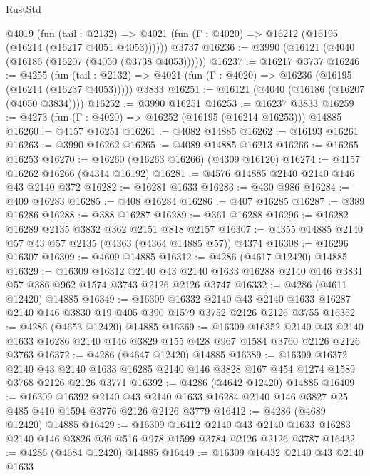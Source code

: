 \begin{lexlean}{RustStd}
\begin{coremodule}
    @4019
      (fun (tail : @2132) =>
      @4021 (fun (Γ : @4020) => @16212 (@16195 (@16214 (@16217 @4051 @4053))))))
    @3737
@16236 := @3990 (@16121 (@4040 (@16186 (@16207 (@4050 (@3738 @4053))))))
@16237 := @16217 @3737
@16246 := @4255
    (fun (tail : @2132) => @4021 (fun (Γ : @4020) => @16236 (@16195 (@16214 (@16237 @4053)))))
    @3833
@16251 := @16121 (@4040 (@16186 (@16207 (@4050 @3834))))
@16252 := @3990 @16251
@16253 := @16237 @3833
@16259 := @4273 (fun (Γ : @4020) => @16252 (@16195 (@16214 @16253))) @14885
@16260 := @4157 @16251
@16261 := @4082 @14885
@16262 := @16193 @16261
@16263 := @3990 @16262
@16265 := @4089 @14885 @16213
@16266 := @16265 @16253
@16270 := @16260 (@16263 @16266) (@4309 @16120)
@16274 := @4157 @16262 @16266 (@4314 @16192)
@16281 := @4576 @14885 @2140 @2140 @146 @43 @2140 @372
@16282 := @16281 @1633
@16283 := @430 @986
@16284 := @409 @16283
@16285 := @408 @16284
@16286 := @407 @16285
@16287 := @389 @16286
@16288 := @388 @16287
@16289 := @361 @16288
@16296 := @16282 @16289 @2135 @3832 @362 @2151 @818 @2157
@16307 := @4355 @14885 @2140 @57 @43 @57 @2135 (@4363 (@4364 @14885 @57)) @4374
@16308 := @16296 @16307
@16309 := @4609 @14885
@16312 := @4286 (@4617 @12420) @14885
@16329 := @16309
    @16312
    @2140
    @43
    @2140
    @1633
    @16288
    @2140
    @146
    @3831
    @57
    @386
    @962
    @1574
    @3743
    @2126
    @2126
    @3747
@16332 := @4286 (@4611 @12420) @14885
@16349 := @16309
    @16332
    @2140
    @43
    @2140
    @1633
    @16287
    @2140
    @146
    @3830
    @19
    @405
    @390
    @1579
    @3752
    @2126
    @2126
    @3755
@16352 := @4286 (@4653 @12420) @14885
@16369 := @16309
    @16352
    @2140
    @43
    @2140
    @1633
    @16286
    @2140
    @146
    @3829
    @155
    @428
    @967
    @1584
    @3760
    @2126
    @2126
    @3763
@16372 := @4286 (@4647 @12420) @14885
@16389 := @16309
    @16372
    @2140
    @43
    @2140
    @1633
    @16285
    @2140
    @146
    @3828
    @167
    @454
    @1274
    @1589
    @3768
    @2126
    @2126
    @3771
@16392 := @4286 (@4642 @12420) @14885
@16409 := @16309
    @16392
    @2140
    @43
    @2140
    @1633
    @16284
    @2140
    @146
    @3827
    @25
    @485
    @410
    @1594
    @3776
    @2126
    @2126
    @3779
@16412 := @4286 (@4689 @12420) @14885
@16429 := @16309
    @16412
    @2140
    @43
    @2140
    @1633
    @16283
    @2140
    @146
    @3826
    @36
    @516
    @978
    @1599
    @3784
    @2126
    @2126
    @3787
@16432 := @4286 (@4684 @12420) @14885
@16449 := @16309
    @16432
    @2140
    @43
    @2140
    @1633

\end{coremodule}
\end{lexlean}

